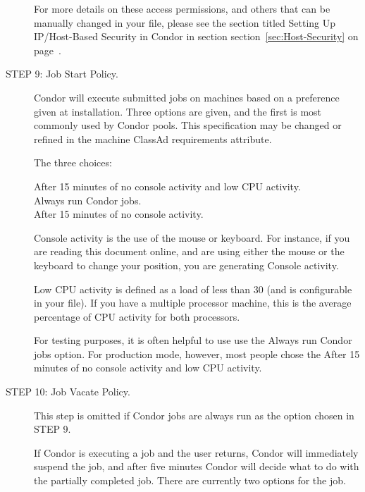 \begin{description}
	 For more details on these access permissions, and others that can be
	 manually changed in your  file, please
	 see the section titled Setting Up IP/Host-Based Security in Condor
	 in section
	 section~\ref{sec:Host-Security}
	 on page~\pageref{sec:Host-Security}.

\item[STEP 9: Job Start Policy.]
     Condor will execute submitted jobs on machines based on
     a preference given at installation.
     Three options are given, and the first is most commonly used
     by Condor pools.
     This specification may be changed or refined in
     the machine ClassAd requirements attribute.

     The three choices:
     \begin{description}
     \item[After 15 minutes of no console activity and low CPU activity.]
     \item[Always run Condor jobs.]
     \item[After 15 minutes of no console activity.]
     \end{description}

     Console activity is the use of the mouse or keyboard.  For instance,
	 if you are reading this document online, and are using either the
	 mouse or the keyboard to change your position, you are generating
	 Console activity.

     Low CPU activity is defined as a load of less than 30\Percent
	 (and is configurable in your  file).  If you have
	 a multiple processor machine, this is the average percentage of
	 CPU activity for both processors.

	For testing purposes, it is often helpful to use use the Always run Condor
	jobs option.  For production mode, however, most people chose the
	After 15 minutes of no console activity and low CPU activity.

\item[STEP 10: Job Vacate Policy.]
     This step is omitted if Condor jobs are always run as
     the option chosen in STEP 9.

     If Condor is executing a job and the user returns,
	 Condor will immediately suspend the job, and after five minutes
	 Condor will decide what to do with the partially completed job.
     There are currently two options for the job.


\end{description}
